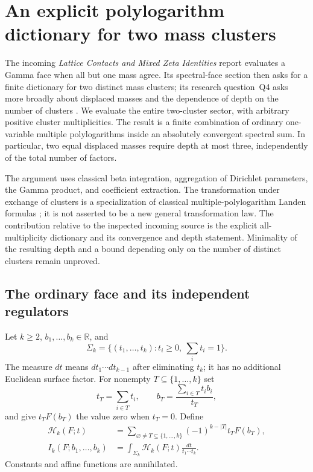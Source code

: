 \documentclass[11pt,a4paper]{article}
\numberwithin{equation}{section}
\theoremstyle{definition}
\theoremstyle{remark}
\begin{document}


\section{An explicit polylogarithm dictionary for two mass clusters}
\label{tc:sec:clusters}

The incoming \emph{Lattice Contacts and Mixed Zeta Identities} report
evaluates a Gamma face when all but one mass agree.  Its spectral-face
section then asks for a finite dictionary for two distinct mass
clusters; its research question~Q4 asks more broadly about displaced
masses and the dependence of depth on the number of clusters
\cite{repolattice}.  We evaluate the entire two-cluster sector,
with arbitrary positive cluster multiplicities.  The result is a
finite combination of ordinary one-variable multiple polylogarithms
inside an absolutely convergent spectral sum.  In particular, two
equal displaced masses require depth at most three, independently
of the total number of factors.

The argument uses classical beta integration, aggregation of Dirichlet
parameters, the Gamma product, and coefficient extraction.  The
transformation under exchange of clusters is a specialization of
classical multiple-polylogarithm Landen formulas
\cite{okudaueno}; it is not asserted to be a new general
transformation law.  The contribution relative to the inspected
incoming source is the explicit all-multiplicity dictionary and its
convergence and depth statement.  Minimality of the resulting depth
and a bound depending only on the number of distinct clusters remain
unproved.

\subsection{The ordinary face and its independent regulators}

Let $k\ge2$, $b_1,\ldots,b_k\in\mathbb R$, and
\[
 \Sigma_k=\{(t_1,\ldots,t_k):t_i\ge0,\ \sum_i t_i=1\}.
\]
The measure $dt$ means $dt_1\cdots dt_{k-1}$ after eliminating
$t_k$; it has no additional Euclidean surface factor.  For nonempty
$T\subseteq\{1,\ldots,k\}$ set
\[
 t_T=\sum_{i\in T}t_i,\qquad
 b_T=\frac{\sum_{i\in T}t_i b_i}{t_T},
\]
and give $t_TF(b_T)$ the value zero when $t_T=0$.  Define
\begin{align}
 \mathcal H_k(F;t)
  &=\sum_{\varnothing\ne T\subseteq\{1,\ldots,k\}}
       (-1)^{k-|T|}t_TF(b_T),\label{tc:eq:face-integrand}\\
 I_k(F;b_1,\ldots,b_k)
  &=\int_{\Sigma_k}\mathcal H_k(F;t)
                    \frac{dt}{t_1\cdots t_k}.
                    \label{tc:eq:ordinary-face}
\end{align}
Constants and affine functions are annihilated.
\end{document}
